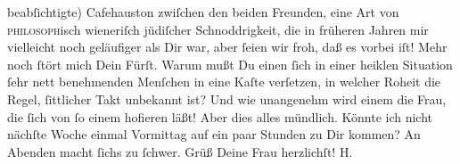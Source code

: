 \begin{ledgroupsized}[t]{13cm}
               beabſichtigte) Cafehauston zwiſchen den beiden Freunden, eine Art von \textsc{philosoph}isch wieneriſch
               jüdiſcher Schnoddrigkeit, die in früheren Jahren mir vielleicht noch geläufiger als
               Dir war, aber ſeien wir froh, daß es vorbei iſt! Mehr noch ſtört mich Dein Fürſt. Warum mußt Du einen ſich in
               einer heiklen Situation ſehr nett benehmenden Menſchen in eine Kaſte verſetzen, in
               welcher Roheit die Regel, ſittlicher Takt unbekannt ist? Und wie unangenehm wird
               einem die Frau, die ſich von ſo einem hofieren läßt! Aber dies alles mündlich. Könnte
               ich nicht nächſte Woche einmal Vormittag auf ein paar Stunden zu Dir kommen? An
               Abenden macht ſichs zu ſchwer. Grüß Deine Frau herzlichſt! \spacefill\mbox{H.}\pend
           \endnumbering{}\end{ledgroupsized}  \newcommand{\dateiname}{L01550}\newcommand{\titel}{Hermann Bahr an Arthur Schnitzler, 20. 9. 1905}\newcommand{\editorInnen}{ Kurt Ifkovits,  Martin Anton Müller}
      